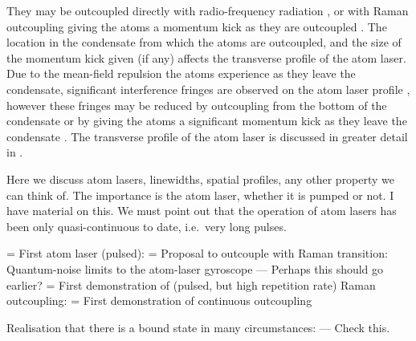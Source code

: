 They may be outcoupled directly with radio-frequency radiation \citep{Mewes:1997,Bloch:1999mi}, or with Raman outcoupling giving the atoms a momentum kick as they are outcoupled \citep{Moy:1997,Hagley:1999dz,Robins:2006fk}.  The location in the condensate from which the atoms are outcoupled, and the size of the momentum kick given (if any) affects the transverse profile of the atom laser.  Due to the mean-field repulsion the atoms experience as they leave the condensate, significant interference fringes are observed on the atom laser profile \citep{Busch:2002zr,Kohl:2005fk}, however these fringes may be reduced by outcoupling from the bottom of the condensate \citep{Riou:2006uq} or by giving the atoms a significant momentum kick as they leave the condensate \citep{Jeppesen:2008}.  The transverse profile of the atom laser is discussed in greater detail in .




Here we discuss atom lasers, linewidths, spatial profiles, any other property we can think of.  The importance is the atom laser, whether it is pumped or not.  I have material on this.  We must point out that the operation of atom lasers has been only quasi-continuous to date, i.e.\ very long pulses.


= First atom laser (pulsed): \citep{Mewes:1997}
= Proposal to outcouple with Raman transition: \citep{Moy:1997}
Quantum-noise limits to the atom-laser gyroscope \citep{Dowling:1998} --- Perhaps this should go earlier?
= First demonstration of (pulsed, but high repetition rate) Raman outcoupling: \citep{Hagley:1999dz}
= First demonstration of continuous outcoupling \citep{Bloch:1999mi}

Realisation that there is a bound state in many circumstances: \citep{Jeffers:2000rr} --- Check this.

